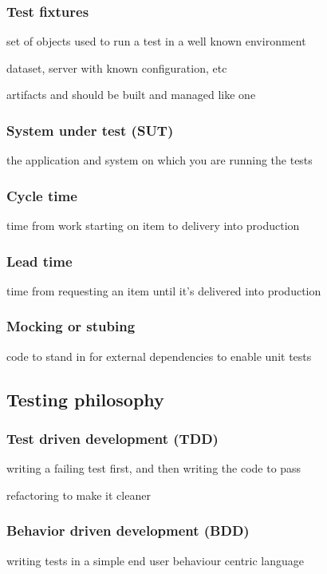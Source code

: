 \documentclass[a4paper,14pt, twocolumn]{extarticle}
\begin{document}
			\subsubsection{Test fixtures}
				set of objects used to run a test in a well known environment
				\begin{compactitem}
					\item dataset, server with known configuration, etc 
					\item artifacts and should be built and managed like one
				\end{compactitem}	
			\subsubsection{System under test (SUT)}
				the application and system on which you are running the tests
			\subsubsection{Cycle time}
				time from work starting on item to delivery into production
			\subsubsection{Lead time }
				time from requesting an item until it’s delivered into production
			\subsubsection{Mocking or stubing }
				code to stand in for external dependencies to enable unit tests
		\newpage
		\subsection{Testing philosophy}
			\subsubsection{Test driven development (TDD) }
				\begin{compactitem}
					\item writing a failing test first, and then writing the code to pass 
					\item refactoring to make it cleaner 
				\end{compactitem}
			\subsubsection{Behavior driven development (BDD)}
				writing tests in a simple end user behaviour centric language 
\end{document}
